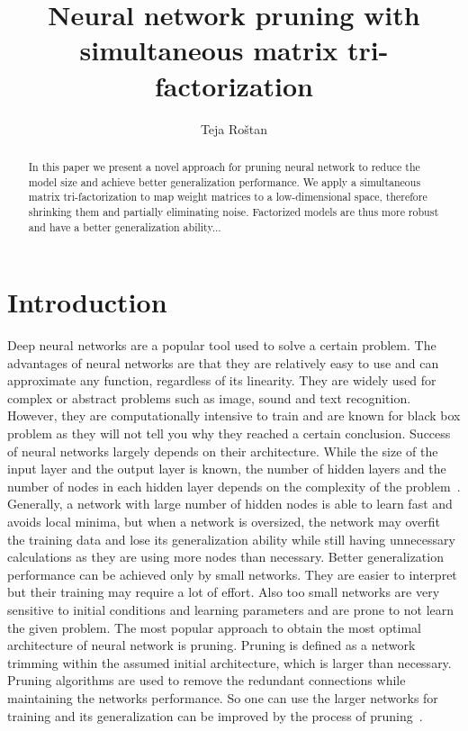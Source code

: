 \documentclass{article} %
\title{Neural network pruning with simultaneous matrix tri-factorization}
\author{Teja Roštan}
\begin{document}
\maketitle

\begin{abstract}
In this paper we present a novel approach for pruning neural network to reduce 
the model size and achieve better generalization performance. We apply a 
simultaneous matrix tri-factorization to map weight matrices to a 
low-dimensional space, therefore shrinking them and partially eliminating noise. 
Factorized models are thus more robust and have a better generalization 
ability...
\end{abstract}

\section{Introduction}
Deep neural networks are a popular tool used to solve a certain problem. The 
advantages of neural networks are that they are relatively easy to use and can 
approximate any function, regardless of its linearity. They are widely used for 
complex or abstract problems such as image, sound and text recognition. However, 
they are computationally intensive to train and are known for black box problem 
as they will not tell you why they reached a certain conclusion. Success of 
neural networks largely depends on their architecture. While the size of the 
input layer and the output layer is known, the number of hidden layers and the 
number of nodes in each hidden layer depends on the complexity of the 
problem~\cite{augasta2013pruning}. Generally, a network with large number of 
hidden nodes is able to learn fast and avoids local minima, but when a network 
is oversized, the network may overfit the training data and lose its 
generalization ability while still having unnecessary calculations as they are 
using more nodes than necessary.  Better generalization performance can be 
achieved only by small networks. They are easier to interpret but their training 
may require a lot of effort. Also too small networks are very sensitive to 
initial conditions and learning parameters and are prone to not learn the given 
problem. The most popular approach to obtain the most optimal architecture of 
neural network is pruning. Pruning is defined as a network trimming within the 
assumed initial architecture, which is larger than necessary. Pruning algorithms 
are used to remove the redundant connections while maintaining the networks 
performance. So one can use the larger networks for training and its 
generalization can be improved by the process of 
pruning~\cite{augasta2013pruning}.
\end{document}
